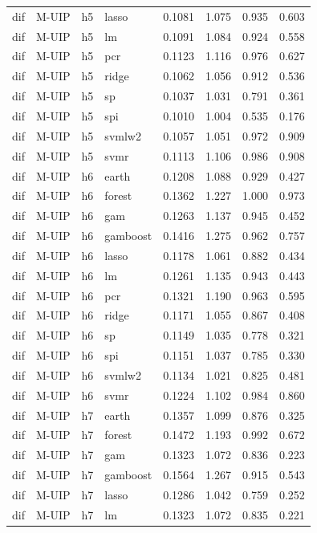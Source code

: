 \begin{ThreePartTable}
\begin{longtable}[t]{llclcccc}
dif & M-UIP & h5 & lasso & 0.1081 & 1.075 & 0.935 & 0.603\\
dif & M-UIP & h5 & lm & 0.1091 & 1.084 & 0.924 & 0.558\\
dif & M-UIP & h5 & pcr & 0.1123 & 1.116 & 0.976 & 0.627\\
dif & M-UIP & h5 & ridge & 0.1062 & 1.056 & 0.912 & 0.536\\
dif & M-UIP & h5 & sp & 0.1037 & 1.031 & 0.791 & 0.361\\
dif & M-UIP & h5 & spi & 0.1010 & 1.004 & 0.535 & 0.176\\
dif & M-UIP & h5 & svmlw2 & 0.1057 & 1.051 & 0.972 & 0.909\\
dif & M-UIP & h5 & svmr & 0.1113 & 1.106 & 0.986 & 0.908\\
\addlinespace
dif & M-UIP & h6 & earth & 0.1208 & 1.088 & 0.929 & 0.427\\
dif & M-UIP & h6 & forest & 0.1362 & 1.227 & 1.000 & 0.973\\
dif & M-UIP & h6 & gam & 0.1263 & 1.137 & 0.945 & 0.452\\
dif & M-UIP & h6 & gamboost & 0.1416 & 1.275 & 0.962 & 0.757\\
dif & M-UIP & h6 & lasso & 0.1178 & 1.061 & 0.882 & 0.434\\
dif & M-UIP & h6 & lm & 0.1261 & 1.135 & 0.943 & 0.443\\
dif & M-UIP & h6 & pcr & 0.1321 & 1.190 & 0.963 & 0.595\\
dif & M-UIP & h6 & ridge & 0.1171 & 1.055 & 0.867 & 0.408\\
dif & M-UIP & h6 & sp & 0.1149 & 1.035 & 0.778 & 0.321\\
dif & M-UIP & h6 & spi & 0.1151 & 1.037 & 0.785 & 0.330\\
dif & M-UIP & h6 & svmlw2 & 0.1134 & 1.021 & 0.825 & 0.481\\
dif & M-UIP & h6 & svmr & 0.1224 & 1.102 & 0.984 & 0.860\\
\addlinespace
dif & M-UIP & h7 & earth & 0.1357 & 1.099 & 0.876 & 0.325\\
dif & M-UIP & h7 & forest & 0.1472 & 1.193 & 0.992 & 0.672\\
dif & M-UIP & h7 & gam & 0.1323 & 1.072 & 0.836 & 0.223\\
dif & M-UIP & h7 & gamboost & 0.1564 & 1.267 & 0.915 & 0.543\\
dif & M-UIP & h7 & lasso & 0.1286 & 1.042 & 0.759 & 0.252\\
dif & M-UIP & h7 & lm & 0.1323 & 1.072 & 0.835 & 0.221\\

\end{longtable}
\end{ThreePartTable}
